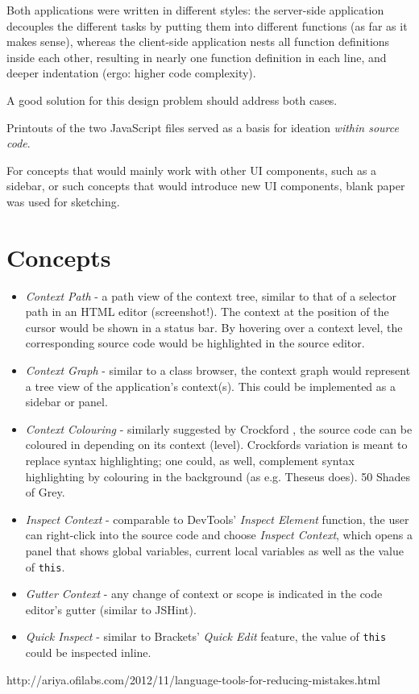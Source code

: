 Both applications were written in different styles: the server-side
application decouples the different tasks by putting them into different
functions (as far as it makes sense), whereas the client-side
application nests all function definitions inside each other, resulting
in nearly one function definition in each line, and deeper indentation
(ergo: higher code complexity).

A good solution for this design problem should address both cases.

Printouts of the two JavaScript files served as a basis for ideation
\emph{within source code}.

For concepts that would mainly work with other UI components, such as a
sidebar, or such concepts that would introduce new UI components, blank
paper was used for sketching.

\section{Concepts}\label{concepts}

\begin{itemize}
\itemsep1pt\parskip0pt
\item
  \emph{Context Path} - a path view of the context tree, similar to that
  of a selector path in an HTML editor (screenshot!). The context at the
  position of the cursor would be shown in a status bar. By hovering
  over a context level, the corresponding source code would be
  highlighted in the source editor.
\item
  \emph{Context Graph} - similar to a class browser, the context graph
  would represent a tree view of the application’s context(s). This
  could be implemented as a sidebar or panel.
\item
  \emph{Context Colouring} - similarly suggested by Crockford
  \citeyear{crockford}, the source code can be coloured in depending on
  its context (level). Crockfords variation is meant to replace syntax
  highlighting; one could, as well, complement syntax highlighting by
  colouring in the background (as e.g. Theseus does). 50 Shades of Grey.
\item
  \emph{Inspect Context} - comparable to DevTools’ \emph{Inspect
  Element} function, the user can right-click into the source code and
  choose \emph{Inspect Context}, which opens a panel that shows global
  variables, current local variables as well as the value of
  \texttt{this}.
\item
  \emph{Gutter Context} - any change of context or scope is indicated in
  the code editor’s gutter (similar to JSHint).
\item
  \emph{Quick Inspect} - similar to Brackets’ \emph{Quick Edit} feature,
  the value of \texttt{this} could be inspected inline.
\end{itemize}

http://ariya.ofilabs.com/2012/11/language-tools-for-reducing-mistakes.html
